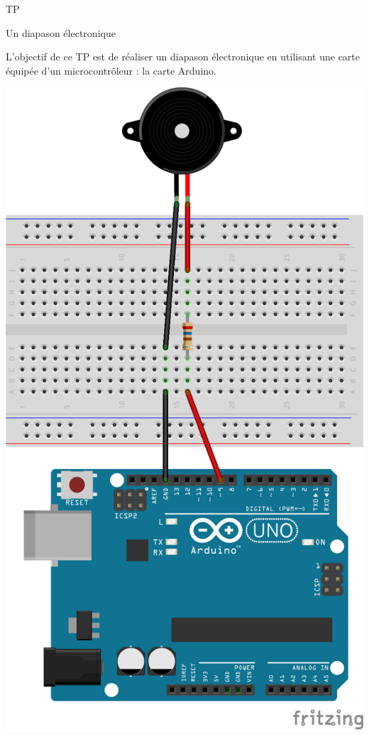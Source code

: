 \documentclass[12pt,a4paper]{article}
\begin{document}
\begin{header}
TP

Un diapason électronique
\end{header}

L'objectif de ce TP est de réaliser un diapason électronique en utilisant une carte équipée d'un microcontrôleur : la carte Arduino.

\begin{center}
\includegraphics[scale=0.8, angle=-90]{fritzing/buzzer_bb.png}
\end{center}
\end{document}
